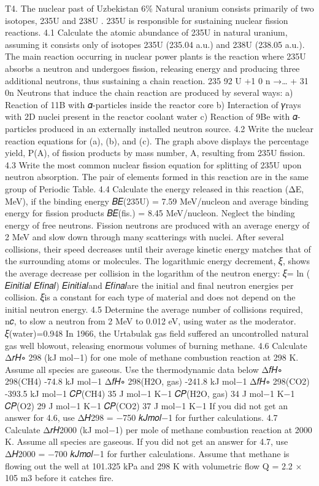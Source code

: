 T4. The nuclear past of Uzbekistan 6\% Natural uranium consists primarily of two isotopes, 235U and 238U . 235U is responsible for sustaining nuclear fission reactions. 4.1 Calculate the atomic abundance of 235U in natural uranium, assuming it consists only of isotopes 235U (235.04 a.u.) and 238U (238.05 a.u.). The main reaction occurring in nuclear power plants is the reaction where 235U absorbs a neutron and undergoes fission, releasing energy and producing three additional neutrons, thus sustaining a chain reaction. 235 92 U +1 0 n →… + 31 0n Neutrons that induce the chain reaction are produced by several ways: a) Reaction of 11B with 𝛼-particles inside the reactor core b) Interaction of 𝛾rays with 2D nuclei present in the reactor coolant water c) Reaction of 9Be with 𝛼-particles produced in an externally installed neutron source. 4.2 Write the nuclear reaction equations for (a), (b), and (c). The graph above displays the percentage yield, P(A), of fission products by mass number, A, resulting from 235U fission. 4.3 Write the most common nuclear fission equation for splitting of 235U upon neutron absorption. The pair of elements formed in this reaction are in the same group of Periodic Table. 4.4 Calculate the energy released in this reaction (ΔE, MeV), if the binding energy 𝐵𝐸(235U) = 7.59 MeV/nucleon and average binding energy for fission products 𝐵𝐸(fis.) = 8.45 MeV/nucleon. Neglect the binding energy of free neutrons. Fission neutrons are produced with an average energy of 2 MeV and slow down through many scatterings with nuclei. After several collisions, their speed decreases until their average kinetic energy matches that of the surrounding atoms or molecules. The logarithmic energy decrement, 𝜉, shows the average decrease per collision in the logarithm of the neutron energy: 𝜉= ln ( 𝐸𝑖𝑛𝑖𝑡𝑖𝑎𝑙 𝐸𝑓𝑖𝑛𝑎𝑙) 𝐸𝑖𝑛𝑖𝑡𝑖𝑎𝑙and 𝐸𝑓𝑖𝑛𝑎𝑙are the initial and final neutron energies per collision. 𝜉is a constant for each type of material and does not depend on the initial neutron energy. 4.5 Determine the average number of collisions required, n𝑐, to slow a neutron from 2 MeV to 0.012 eV, using water as the moderator. 𝜉(water)=0.948 In 1966, the Urtabulak gas field suffered an uncontrolled natural gas well blowout, releasing enormous volumes of burning methane. 4.6 Calculate Δ𝑟𝐻∘ 298 (kJ mol−1) for one mole of methane combustion reaction at 298 K. Assume all species are gaseous. Use the thermodynamic data below Δ𝑓𝐻∘ 298(CH4) -74.8 kJ mol−1 Δ𝑓𝐻∘ 298(H2O, gas) -241.8 kJ mol−1 Δ𝑓𝐻∘ 298(CO2) -393.5 kJ mol−1 𝐶𝑃(CH4) 35 J mol−1 K−1 𝐶𝑃(H2O, gas) 34 J mol−1 K−1 𝐶𝑃(O2) 29 J mol−1 K−1 𝐶𝑃(CO2) 37 J mol−1 K−1 If you did not get an answer for 4.6, use Δ𝐻298 = −750 𝑘𝐽𝑚𝑜𝑙−1 for further calculations. 4.7 Calculate Δ𝑟𝐻2000 (kJ mol−1) per mole of methane combustion reaction at 2000 K. Assume all species are gaseous. If you did not get an answer for 4.7, use Δ𝐻2000 = −700 𝑘𝐽𝑚𝑜𝑙−1 for further calculations. Assume that methane is flowing out the well at 101.325 kPa and 298 K with volumetric flow Q = 2.2 × 105 m3 before it catches fire.

